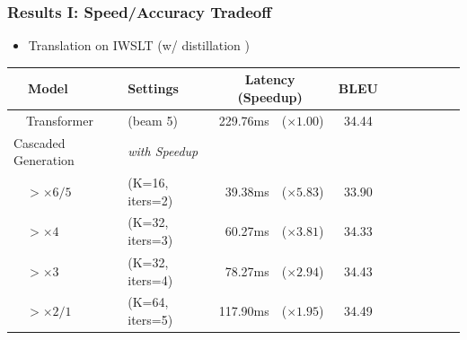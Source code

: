 \documentclass{beamer}
\begin{document}
\begin{frame}
\frametitle{Results I: Speed/Accuracy Tradeoff}
\begin{itemize}
    \item Translation on IWSLT (w/ distillation {\tiny\citep{kim2016sequence}})
\end{itemize}

\begin{table}[H]
    \centering
    \begin{tabular}{@{}l@{}lr@{ }lccccccc@{}}
    \toprule
       \ \  Model     &  Settings                  &       \multicolumn{2}{c}{Latency (Speedup)}                & BLEU   \\
    \midrule
    \ \ Transformer &(beam 5)  &229.76ms & ($\times1.00$)         &         34.44           \\
    \midrule
    Cascaded Generation &\hspace{0.01cm} \emph{with Speedup}\\
    \ \ $> \times 6/5$ &(K=16, iters=2)&39.38ms & ($\times5.83$)       &  33.90 \\
\ \ $> \times 4$ &(K=32, iters=3)&60.27ms& ($\times3.81$)        & 34.33  \\
\ \ $> \times 3$ &(K=32, iters=4)&78.27ms &($\times2.94$)       &  34.43 \\
\ \ $>\times 2/1$ &(K=64, iters=5)&117.90ms &($\times1.95$)       &  34.49 \\

\end{tabular}
\end{table}
\end{frame}
\end{document}
